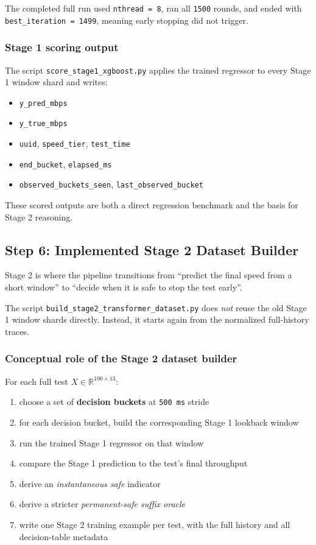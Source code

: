 \documentclass[11pt]{article}
\begin{document}
The completed full run used \texttt{nthread = 8}, ran all \texttt{1500} rounds, and ended with \texttt{best\_iteration = 1499}, meaning early stopping did not trigger.

\subsubsection*{Stage 1 scoring output}

The script \texttt{score\_stage1\_xgboost.py} applies the trained regressor to every Stage 1 window shard and writes:
\begin{itemize}
\item \texttt{y\_pred\_mbps}
\item \texttt{y\_true\_mbps}
\item \texttt{uuid}, \texttt{speed\_tier}, \texttt{test\_time}
\item \texttt{end\_bucket}, \texttt{elapsed\_ms}
\item \texttt{observed\_buckets\_seen}, \texttt{last\_observed\_bucket}
\end{itemize}

These scored outputs are both a direct regression benchmark and the basis for Stage 2 reasoning.

\subsection{Step 6: Implemented Stage 2 Dataset Builder}

Stage 2 is where the pipeline transitions from ``predict the final speed from a short window'' to ``decide when it is safe to stop the test early''.

The script \texttt{build\_stage2\_transformer\_dataset.py} does \emph{not} reuse the old Stage 1 window shards directly. Instead, it starts again from the normalized full-history traces.

\subsubsection*{Conceptual role of the Stage 2 dataset builder}

For each full test \(X \in \mathbb{R}^{100 \times 13}\):
\begin{enumerate}
\item choose a set of \textbf{decision buckets} at \texttt{500 ms} stride
\item for each decision bucket, build the corresponding Stage 1 lookback window
\item run the trained Stage 1 regressor on that window
\item compare the Stage 1 prediction to the test's final throughput
\item derive an \emph{instantaneous safe} indicator
\item derive a stricter \emph{permanent-safe suffix oracle}
\item write one Stage 2 training example per test, with the full history and all decision-table metadata
\end{enumerate}
\end{document}
